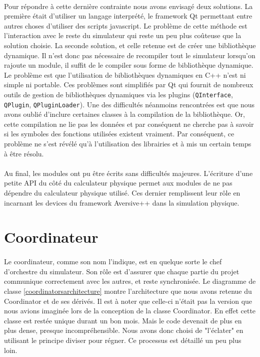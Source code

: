 \paragraph{}
Pour répondre à cette dernière contrainte nous avons envisagé deux solutions. La première était d'utiliser un langage interprété, le framework Qt permettant entre autres choses d'utiliser des scripts javascript. Le problème de cette méthode est l'interaction avec le reste du simulateur qui reste un peu plus coûteuse que la solution choisie. La seconde solution, et celle retenue est de créer une bibliothèque dynamique. Il n'est donc pas nécessaire de recompiler tout le simulateur lorsqu'on rajoute un module, il suffit de le compiler sous forme de bibliothèque dynamique. Le problème est que l'utilisation de bibliothèques dynamiques en C++ n'est ni simple ni portable. Ces problèmes sont simplifiés par Qt qui fournit de nombreux outils de gestion de bibliothèques dynamiques via les plugins (\texttt{QInterface}, \texttt{QPlugin}, \texttt{QPluginLoader}). Une des difficultés néanmoins rencontrées est que nous avons oublié d'inclure certaines classes à la compilation de la bibliothèque. Or, cette compilation ne lie pas les données et par conséquent ne cherche pas à savoir si les symboles des fonctions utilisées existent vraiment. Par conséquent, ce problème ne s'est révélé qu'à l'utilisation des librairies et à mis un certain temps à être résolu.

\paragraph{}
Au final, les modules ont pu être écrits sans difficultés majeures. L'écriture d'une petite API du côté du calculateur physique permet aux modules de ne pas dépendre du calculateur physique utilisé. Ces dernier remplissent leur rôle en incarnant les devices du framework Aversive++ dans la simulation physique.

\section{Coordinateur}

\paragraph{}
Le coordinateur, comme son nom l'indique, est en quelque sorte le chef d'orchestre du simulateur. Son rôle est d'assurer que chaque partie du projet communique correctement avec les autres, et reste synchronisée. Le diagramme de classe \ref{coordinatorsarchitecture} montre l'architecture que nous avons retenue du Coordinator et de ses dérivés. Il est à noter que celle-ci n'était pas la version que nous avions imaginée lors de la conception de la classe Coordinator. En effet cette classe est restée unique durant un bon mois. Mais le code devenait de plus en plus dense, presque incompréhensible. Nous avons donc choisi de "l'éclater" en utilisant le principe diviser pour régner. Ce processus est détaillé un peu plus loin.

